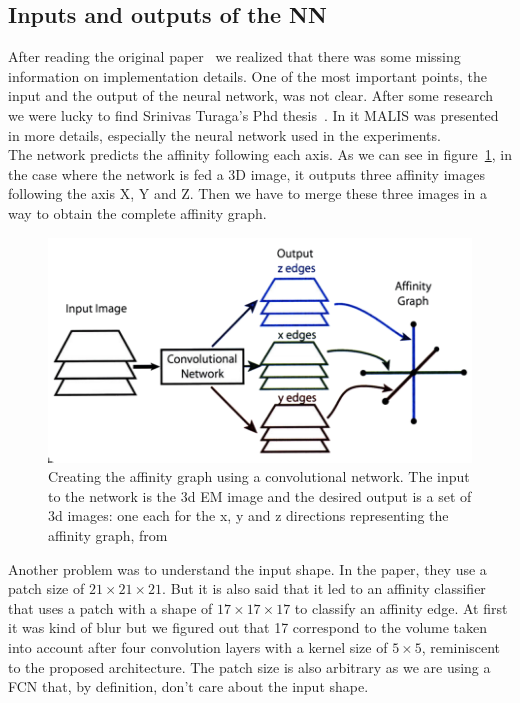 \subsection{Inputs and outputs of the NN}

After reading the original paper~\cite{turaga_maximin_2009} we realized that
there was some missing information on implementation details.
One of the most important points, the input and the output of the neural
network, was not clear. After some research we were lucky to find Srinivas
Turaga's Phd thesis~\cite{turaga_learning_2010}. In it MALIS was presented in
more details, especially the neural network used in the experiments.\\

The network predicts the affinity following each axis. As we can see in
figure~\ref{fig:nn_output}, in the case where the network is fed a 3D image, it
outputs three affinity images following the axis X, Y and Z. Then we have to
merge these three images in a way to obtain the complete affinity graph.

\begin{figure}[!htbp]
	\centering
	\includegraphics[width=0.8\linewidth]{./images/nn_output.png}
	\caption{Creating the affinity graph using a convolutional network. The
	input to the network is the 3d EM image and the desired output is a set of
3d images: one each for the x, y and z directions representing the affinity
graph, from~\cite{turaga_learning_2010}}%
	\label{fig:nn_output}
\end{figure}

Another problem was to understand the input shape. In the paper, they use a
patch size of $21\times21\times21$. But it is also said that it led to an affinity
classifier that uses a patch with a shape of $17\times17\times17$ to classify an affinity
edge. At first it was kind of blur but we figured out that 17 correspond
to the volume taken into account after four convolution layers with a kernel
size of $5\times5$, reminiscent to the proposed architecture. The patch size is also arbitrary as we are using a FCN that, by definition, don’t care about the input shape.\\

